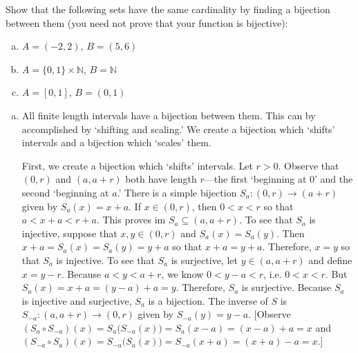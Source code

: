 \documentclass[11pt,letterpaper]{article}
\begin{document}

 Show that the following sets have the same cardinality by finding a bijection between them (you need not prove that your function is bijective): 
        \begin{enumerate}[(a)]
        \item $A= (-2, 2)$, $B= (5, 6)$
        \item $A= \{ 0, 1 \} \times \mathbb{N}$, $B= \mathbb{N}$
        \item $A= [0, 1]$, $B= (0, 1)$
        \end{enumerate} \pspace

\sol 
\begin{enumerate}[(a)]
\item All finite length intervals have a bijection between them. This can by accomplished by `shifting and scaling.' We create a bijection which `shifts' intervals and a bijection which `scales' them. \pspace

First, we create a bijection which `shifts' intervals. Let $r > 0$. Observe that $(0, r)$ and $(a, a + r)$ both have length $r$---the first `beginning at $0$' and the second `beginning at $a$.' There is a simple bijection $S_a: (0, r) \to (a + r)$ given by $S_a(x)= x + a$. If $x \in (0, r)$, then $0 < x < r$ so that $a < x + a < r + a$. This proves $\text{im } S_a \subseteq (a, a + r)$. To see that $S_a$ is injective, suppose that $x, y \in (0, r)$ and $S_a(x)= S_a(y)$. Then $x + a= S_a(x)= S_a(y)= y + a$ so that $x + a= y + a$. Therefore, $x= y$ so that $S_a$ is injective. To see that $S_a$ is surjective, let $y \in (a, a + r)$ and define $x= y - r$. Because $a < y < a + r$, we know $0 < y - a < r$, i.e. $0 < x < r$. But $S_a(x)= x + a= (y - a) + a= y$. Therefore, $S_a$ is surjective. Because $S_a$ is injective and surjective, $S_a$ is a bijection. The inverse of $S$ is $S_{-a}: (a, a + r) \to (0, r)$ given by $S_{-a}(y)= y - a$. [Observe $(S_a \circ S_{-a})(x)= S_a \big( S_{-a}(x) \big)= S_a(x - a)= (x - a) + a= x$ and $(S_{-a} \circ S_a)(x)= S_{-a} \big( S_a(x) \big)= S_{-a}(x + a)= (x + a) - a= x$.] \pspace


\end{enumerate}
\end{document}
